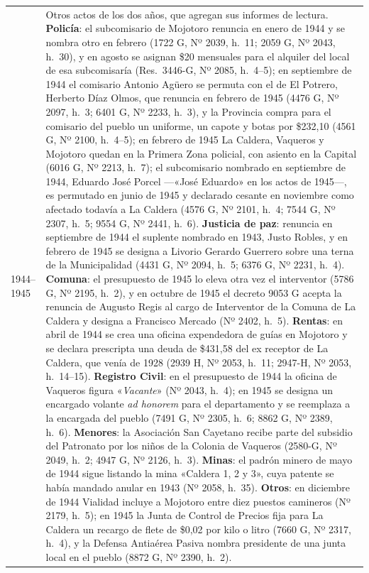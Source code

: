 \begin{longtable}{@{}p{2.7cm}p{10.3cm}@{}}
1944--1945 & Otros actos de los dos años, que agregan sus informes de lectura. \textbf{Policía}: el subcomisario de Mojotoro renuncia en enero de 1944 y se nombra otro en febrero (1722 G, Nº 2039, h.\ 11; 2059 G, Nº 2043, h.\ 30), y en agosto se asignan \$20 mensuales para el alquiler del local de esa subcomisaría (Res.\ 3446-G, Nº 2085, h.\ 4--5); en septiembre de 1944 el comisario Antonio Agüero se permuta con el de El Potrero, Herberto Díaz Olmos, que renuncia en febrero de 1945 (4476 G, Nº 2097, h.\ 3; 6401 G, Nº 2233, h.\ 3), y la Provincia compra para el comisario del pueblo un uniforme, un capote y botas por \$232,10 (4561 G, Nº 2100, h.\ 4--5); en febrero de 1945 La Caldera, Vaqueros y Mojotoro quedan en la Primera Zona policial, con asiento en la Capital (6016 G, Nº 2213, h.\ 7); el subcomisario nombrado en septiembre de 1944, Eduardo José Porcel ---«José Eduardo» en los actos de 1945---, es permutado en junio de 1945 y declarado cesante en noviembre como afectado todavía a La Caldera (4576 G, Nº 2101, h.\ 4; 7544 G, Nº 2307, h.\ 5; 9554 G, Nº 2441, h.\ 6). \textbf{Justicia de paz}: renuncia en septiembre de 1944 el suplente nombrado en 1943, Justo Robles, y en febrero de 1945 se designa a Livorio Gerardo Guerrero sobre una terna de la Municipalidad (4431 G, Nº 2094, h.\ 5; 6376 G, Nº 2231, h.\ 4). \textbf{Comuna}: el presupuesto de 1945 lo eleva otra vez el interventor (5786 G, Nº 2195, h.\ 2), y en octubre de 1945 el decreto 9053 G acepta la renuncia de Augusto Regis al cargo de Interventor de la Comuna de La Caldera y designa a Francisco Mercado (Nº 2402, h.\ 5). \textbf{Rentas}: en abril de 1944 se crea una oficina expendedora de guías en Mojotoro y se declara prescripta una deuda de \$431,58 del ex receptor de La Caldera, que venía de 1928 (2939 H, Nº 2053, h.\ 11; 2947-H, Nº 2053, h.\ 14--15). \textbf{Registro Civil}: en el presupuesto de 1944 la oficina de Vaqueros figura «\textit{Vacante}» (Nº 2043, h.\ 4); en 1945 se designa un encargado volante \textit{ad honorem} para el departamento y se reemplaza a la encargada del pueblo (7491 G, Nº 2305, h.\ 6; 8862 G, Nº 2389, h.\ 6). \textbf{Menores}: la Asociación San Cayetano recibe parte del subsidio del Patronato por los niños de la Colonia de Vaqueros (2580-G, Nº 2049, h.\ 2; 4947 G, Nº 2126, h.\ 3). \textbf{Minas}: el padrón minero de mayo de 1944 sigue listando la mina «Caldera 1, 2 y 3», cuya patente se había mandado anular en 1943 (Nº 2058, h.\ 35). \textbf{Otros}: en diciembre de 1944 Vialidad incluye a Mojotoro entre diez puestos camineros (Nº 2179, h.\ 5); en 1945 la Junta de Control de Precios fija para La Caldera un recargo de flete de \$0,02 por kilo o litro (7660 G, Nº 2317, h.\ 4), y la Defensa Antiaérea Pasiva nombra presidente de una junta local en el pueblo (8872 G, Nº 2390, h.\ 2). \\

\end{longtable}
